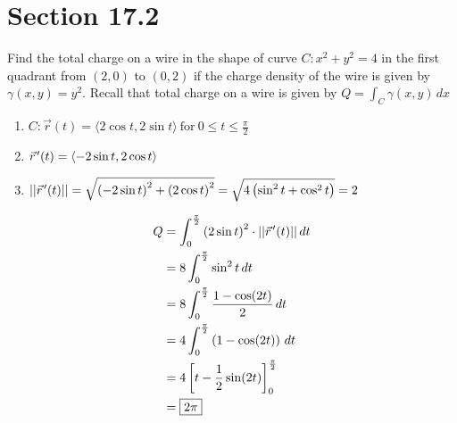\documentclass[letter,11pt]{article}
\newcommand{\pvec}[1]{\vec{#1}\mkern2mu\vphantom{#1}}
\begin{document}
\section*{Section 17.2}
Find the total charge on a wire in the shape of curve $C : x^2 + y^2 = 4$ in the first quadrant from $(2, 0)$ to $(0, 2)$ if the charge density of the wire is given by $\gamma(x, y) = y^2$. Recall that total charge on a wire is given by $Q =\int_{C}\gamma(x, y) \,dx$
\begin{enumerate}[label=\roman*.]
    \item $C: \vec{r}(t)=\langle 2\cos t, 2\sin t\rangle ~\text{for}~ 0 \leq t \leq \frac{\pi}{2}$
    \item $\pvec{r}'(t) = \langle-2\sin t,2\cos t \rangle$
    \item $||\pvec{r}'(t)|| = \sqrt{\left(-2\sin t\right)^{2}+\left(2\cos t\right)^{2}} = \sqrt{4\left(\sin^{2}t+\cos^{2}t\right)} = 2$
\end{enumerate}
\begin{align*}
    Q &= \int_{0}^{\frac{\pi}{2}}\left(2\sin t\right)^{2} \cdot||\pvec{r}'(t)|| \,dt\\
    &= 8\int_{0}^{\frac{\pi}{2}}\sin^2 t \, dt\\
    &= 8\int_{0}^{\frac{\pi}{2}} \frac{1-\cos(2t)}{2} \, dt\\
    &= 4\int_{0}^{\frac{\pi}{2}} \left(1-\cos(2t)\right) \,dt\\
    & = 4\left[t - \frac{1}{2}\sin(2t)\right]_{0}^{\frac{\pi}{2}}\\
    &= \boxed{2\pi}
\end{align*}
\end{document}
